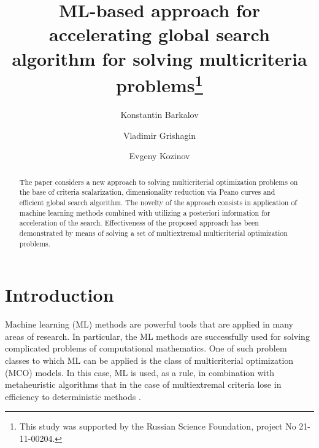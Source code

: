 \documentclass[runningheads]{llncs}
\begin{document}
%
\title{ML-based approach for accelerating global search algorithm for solving multicriteria problems\thanks{This study was supported by the Russian Science Foundation, project No 21-11-00204.}}
%
%
\author{Konstantin Barkalov \and
Vladimir Grishagin \and
Evgeny Kozinov}
%
%
%
\maketitle              %
%
\begin{abstract}
The paper considers a new approach to solving multicriterial optimization problems on the base of criteria scalarization, dimensionality reduction via Peano curves and efficient global search algorithm. The novelty of the approach consists in application of machine learning methods combined with utilizing a posteriori information for acceleration of the search. Effectiveness of the proposed approach has been demonstrated by means of solving a set of multiextremal multicriterial optimization problems.

\end{abstract}
%
%
%
\section{Introduction}
Machine learning (ML) methods are powerful tools that are applied in many areas of research.
In particular, the ML methods are successfully used for solving complicated problems of computational mathematics. One of such problem classes to which ML can be applied is the class of multicriterial optimization (MCO) models. 
In this case, ML is used, as a rule, in combination with metaheuristic algorithms \cite{Ma2014,Subraveti2019,Talbi2015} that in the case of multiextremal criteria lose in efficiency to deterministic methods \cite{Kvasov2018,Sergeyev2018}.
\end{document}
